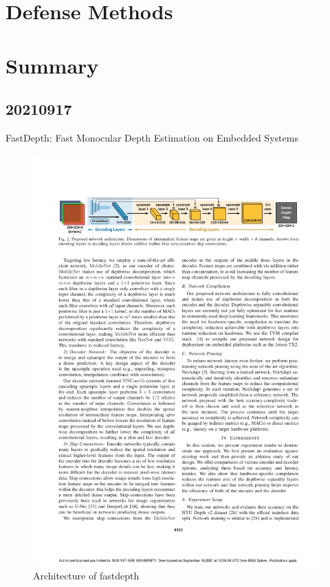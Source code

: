 \documentclass[10pt]{beamer}
\begin{document}
\section{Defense Methods}

\section{Summary}
\subsection{20210917}
\begin{frame}
  FastDepth: Fast Monocular Depth Estimation on Embedded Systems~\cite{fastdepth}
  \begin{figure}
    \centering
    \includegraphics[width=1\linewidth]{figure/20210917/FastDepth_Architecture.pdf}
    \caption{Architecture of fastdepth}
  \end{figure}
\end{frame}
\end{document}
